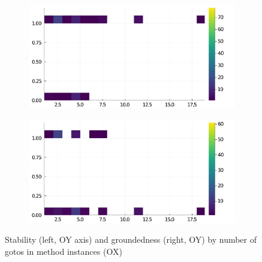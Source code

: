 \begin{figure}[h]
     \begin{subfigure}[b]{0.49\textwidth}
       \includegraphics[width=\textwidth]{figs/all-package-graphs/IJulia-gotos-vs-stable.pdf}
     \end{subfigure}
     \begin{subfigure}[b]{0.49\textwidth}
       \includegraphics[width=\textwidth]{figs/all-package-graphs/IJulia-gotos-vs-grounded.pdf}
     \end{subfigure}
\caption{Stability (left, OY axis) and groundedness (right, OY) by number of gotos in method instances (OX)}%
%
\label{figs:gotos:IJulia}
\end{figure}


